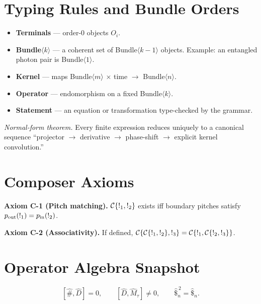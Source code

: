 \section{Typing Rules and Bundle Orders}

\begin{itemize}[leftmargin=1.5em]
  \item \textbf{Terminals} — order-0 objects \(O_i\).
  \item \textbf{Bundle\(\langle k\rangle\)} — a coherent set of Bundle\(\langle k-1\rangle\) objects. Example: an entangled photon pair is Bundle\(\langle 1\rangle\).
  \item \textbf{Kernel} — maps Bundle\(\langle m\rangle\) \(\times\) time \(\to\) Bundle\(\langle n\rangle\).
  \item \textbf{Operator} — endomorphism on a fixed Bundle\(\langle k\rangle\).
  \item \textbf{Statement} — an equation or transformation type-checked by the grammar.
\end{itemize}

\noindent\textit{Normal-form theorem.} Every finite expression reduces uniquely to a
canonical sequence “projector \(\to\) derivative \(\to\) phase-shift \(\to\) explicit kernel convolution.”

\section{Composer Axioms}

\textbf{Axiom C-1 (Pitch matching).}\;
\(\mathcal{C}\{\mathsf{!}_{1},\mathsf{!}_{2}\}\) exists iff boundary pitches satisfy
\(p_{\mathrm{out}}(\mathsf{!}_{1})=p_{\mathrm{in}}(\mathsf{!}_{2})\).

\medskip
\textbf{Axiom C-2 (Associativity).}\;
If defined,
\(\mathcal{C}\{\mathcal{C}\{\mathsf{!}_{1},\mathsf{!}_{2}\},\mathsf{!}_{3}\}=\mathcal{C}\{\mathsf{!}_{1},\mathcal{C}\{\mathsf{!}_{2},\mathsf{!}_{3}\}\}\).

\section{Operator Algebra Snapshot}

\[
[\hat{\#},\hat{D}]=0,\qquad
[\hat{D},\hat{M}_{\tau}]\neq 0,\qquad
\hat{\$}_n^{\,2}=\hat{\$}_n.
\]

